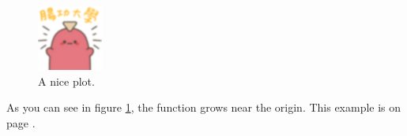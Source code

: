 \documentclass{article}
\begin{document}
\begin{figure}[h]
    \centering
    \includegraphics{universe}
    \caption{A nice plot.}
    \label{fig:1}
\end{figure} 

As you can see in figure \ref{fig:1}, the function grows near the origin. This example is on page \pageref{fig:1}.
\end{document}
